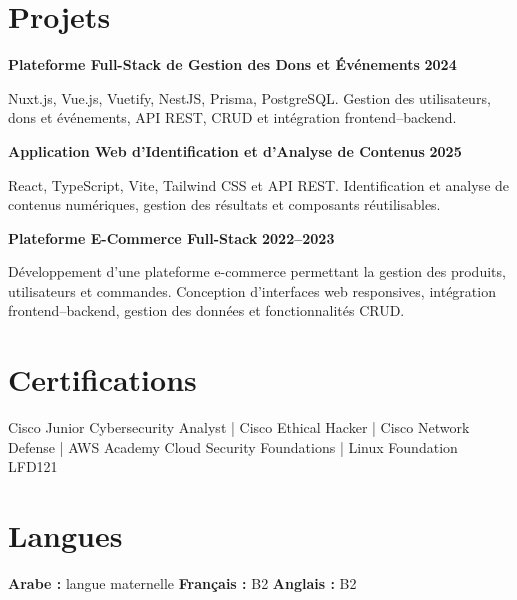 \documentclass[10pt,a4paper]{article}
\begin{document}

\section*{Projets}

\textbf{Plateforme Full-Stack de Gestion des Dons et Événements}
\hfill \textbf{2024}

Nuxt.js, Vue.js, Vuetify, NestJS, Prisma, PostgreSQL. Gestion des utilisateurs,
dons et événements, API REST, CRUD et intégration frontend--backend.

\textbf{Application Web d'Identification et d'Analyse de Contenus}
\hfill \textbf{2025}

React, TypeScript, Vite, Tailwind CSS et API REST. Identification et analyse
de contenus numériques, gestion des résultats et composants réutilisables.

\textbf{Plateforme E-Commerce Full-Stack}
\hfill \textbf{2022--2023}

Développement d'une plateforme e-commerce permettant la gestion des produits,
utilisateurs et commandes. Conception d'interfaces web responsives,
intégration frontend--backend, gestion des données et fonctionnalités CRUD.


\section*{Certifications}

Cisco Junior Cybersecurity Analyst \;|\;
Cisco Ethical Hacker \;|\;
Cisco Network Defense \;|\;
AWS Academy Cloud Security Foundations \;|\;
Linux Foundation LFD121


\section*{Langues}

\textbf{Arabe :} langue maternelle \quad
\textbf{Français :} B2 \quad
\textbf{Anglais :} B2
\end{document}
